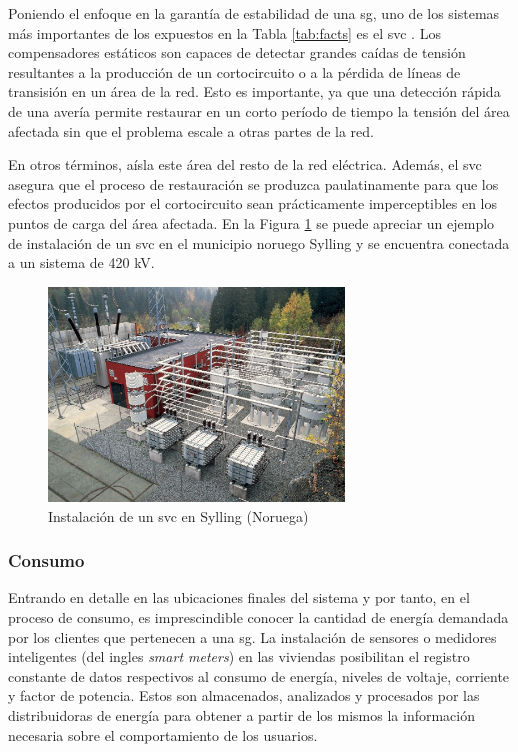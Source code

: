 \vspace{0.3cm}

Poniendo el enfoque en la garantía de estabilidad de una \gls{sg}, uno de los sistemas más importantes de los expuestos en la Tabla \ref{tab:facts} es el \gls{svc} \cite{facts}. Los compensadores estáticos son capaces de detectar grandes caídas de tensión resultantes a la producción de un cortocircuito o a la pérdida de líneas de transisión en un área de la red. Esto es importante, ya que una detección rápida de una avería permite restaurar en un corto período de tiempo la tensión del área afectada sin que el problema escale a otras partes de la red. 

\vspace{0.3cm}

En otros términos, aísla este área del resto de la red eléctrica. Además, el \gls{svc} asegura que el proceso de restauración se produzca paulatinamente para que los efectos producidos por el cortocircuito sean prácticamente imperceptibles en los puntos de carga del área afectada. En la Figura \ref{fig:svc} se puede apreciar un ejemplo de instalación de un \gls{svc} en el municipio noruego Sylling y se encuentra conectada a un sistema de 420 kV.

\vspace{0.3cm}

\begin{figure}[h]
  \centering
  \includegraphics[width=0.7\textwidth]{img/teoria/svc.png}
  \caption{Instalación de un \gls{svc} en Sylling (Noruega) \cite{facts}}
  \label{fig:svc}
\end{figure}

\subsubsection{Consumo}

Entrando en detalle en las ubicaciones finales del sistema y por tanto, en el proceso de consumo, es imprescindible conocer la cantidad de energía demandada por los clientes que pertenecen a una \gls{sg}. La instalación de sensores o medidores inteligentes (del ingles \textit{smart meters}) en las viviendas posibilitan el registro constante de datos respectivos al consumo de energía, niveles de voltaje, corriente y factor de potencia. Estos son almacenados, analizados y procesados por las distribuidoras de energía para obtener a partir de los mismos la información necesaria sobre el comportamiento de los usuarios. \cite{stab}

